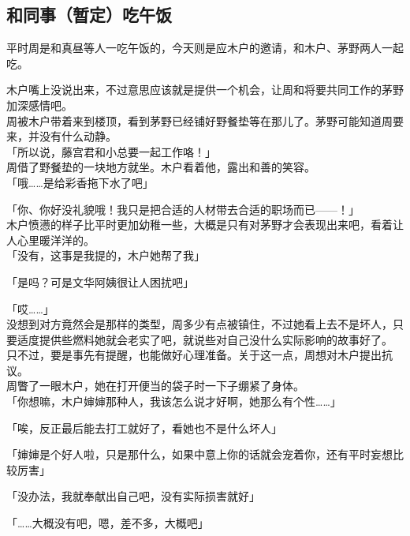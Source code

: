 \subsection{和同事（暂定）吃午饭}

平时周是和真昼等人一吃午饭的，今天则是应木户的邀请，和木户、茅野两人一起吃。

木户嘴上没说出来，不过意思应该就是提供一个机会，让周和将要共同工作的茅野加深感情吧。\\

周被木户带着来到楼顶，看到茅野已经铺好野餐垫等在那儿了。茅野可能知道周要来，并没有什么动静。\\

「所以说，藤宫君和小总要一起工作咯！」\\

周借了野餐垫的一块地方就坐。木户看着他，露出和善的笑容。\\

「哦……是给彩香拖下水了吧」

「你、你好没礼貌哦！我只是把合适的人材带去合适的职场而已——！」\\

木户愤懑的样子比平时更加幼稚一些，大概是只有对茅野才会表现出来吧，看着让人心里暖洋洋的。\\

「没有，这事是我提的，木户她帮了我」

「是吗？可是文华阿姨很让人困扰吧」

「哎……」\\

没想到对方竟然会是那样的类型，周多少有点被镇住，不过她看上去不是坏人，只要适度提供些燃料她就会老实了吧，就说些对自己没什么实际影响的故事好了。\\

只不过，要是事先有提醒，也能做好心理准备。关于这一点，周想对木户提出抗议。\\

周瞥了一眼木户，她在打开便当的袋子时一下子绷紧了身体。\\

「你想嘛，木户婶婶那种人，我该怎么说才好啊，她那么有个性……」

「唉，反正最后能去打工就好了，看她也不是什么坏人」

「婶婶是个好人啦，只是那什么，如果中意上你的话就会宠着你，还有平时妄想比较厉害」

「没办法，我就奉献出自己吧，没有实际损害就好」

「……大概没有吧，嗯，差不多，大概吧」\\

